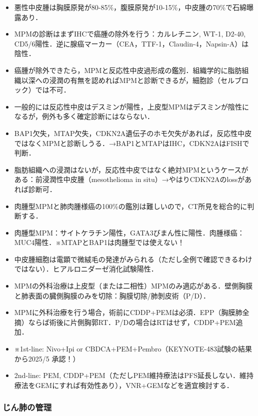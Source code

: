 \begin{itemize}
\item 悪性中皮腫は胸膜原発が80-85\%，腹膜原発が10-15\%，中皮腫の70\%で石綿曝露あり．
\item MPMの診断はまずIHCで癌腫の除外を行う：カルレチニン, WT-1, D2-40, CD5/6陽性．逆に腺癌マーカー（CEA，TTF-1，Claudin-4，Napsin-A）は陰性．
\item 癌腫が除外できたら，MPMと反応性中皮過形成の鑑別．組織学的に脂肪組織以深への浸潤の有無を認めればMPMと診断できるが，細胞診（セルブロック）では不可．
\item 一般的には反応性中皮はデスミンが陽性，上皮型MPMはデスミンが陰性になるが，例外も多く確定診断にはならない．
\item BAP1欠失，MTAP欠失，CDKN2A遺伝子のホモ欠失があれば，反応性中皮ではなくMPMと診断しうる．→BAP1とMTAPはIHC，CDKN2AはFISHで判断．
\item 脂肪組織への浸潤はないが，反応性中皮ではなく絶対MPMというケースがある：前浸潤性中皮腫（mesothelioma in situ）→やはりCDKN2Aのlossがあれば診断可．
\item 肉腫型MPMと肺肉腫様癌の100\%の鑑別は難しいので，CT所見を総合的に判断する．
\item 肉腫型MPM：サイトケラチン陽性，GATA3びまん性に陽性．肉腫様癌：MUC4陽性．※MTAPとBAP1は肉腫型では使えない！
\item 中皮腫細胞は電顕で微絨毛の発達がみられる（ただし全例で確認できるわけではない）．ヒアルロニダーゼ消化試験陽性．
\item MPMの外科治療は上皮型（または二相性）MPMのみ適応がある．壁側胸膜と肺表面の臓側胸膜のみを切除：胸膜切除/肺剝皮術（P/D）．
\item MPMに外科治療を行う場合，術前にCDDP+PEMは必須．EPP（胸膜肺全摘）ならば術後に片側胸郭RT．P/Dの場合はRTはせず，CDDP+PEM追加．
\item ※1st-line: Nivo+Ipi or CBDCA+PEM+Pembro（KEYNOTE-483試験の結果から2025/5 承認！）
\item 2nd-line: PEM, CDDP+PEM（ただしPEM維持療法はPFS延長しない．維持療法をGEMにすれば有効性あり），VNR+GEMなどを適宜検討する．
\end{itemize}


\subsubsection{じん肺の管理}

